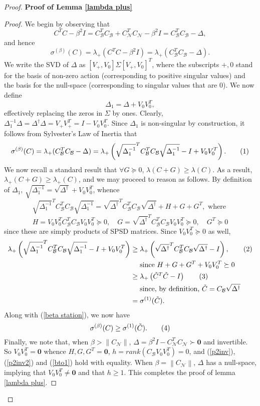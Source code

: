 \documentclass[11pt]{article}
\newcommand{\norm}[1]{\left\|#1\right\|}
\newcommand{\Geq}{\succeq}
\newcommand{\B}{\mathcal{B}}
\newcommand{\N}{\mathcal{N}}
\newcommand{\0}{\ensuremath{\mathbf{0}}}
\renewcommand{\>}{\succ}
\newcommand{\<}{\prec}
\newcommand\numberthis{\addtocounter{equation}{1}\tag{\theequation}}
\begin{document}
\begin{proof}
\noindent \textbf{Proof of Lemma \ref{lambda plus}}
\begin{proof}
We begin by observing that
\[ C^T C - \beta^2 I  = C_{\B} ^T C_{\B} + C_{\N} ^T C_{\N} - \beta^2 I = C_{\B} ^T C_{\B}  - \Delta, \]
and hence
\[ \sigma^{(\beta)} (C) = \lambda_+ \left( C^T C - \beta^2 I \right) = \lambda_+ \left( C_{\B} ^T C_{\B}  - \Delta \right). \]
We write the SVD of $\Delta$ as $[V_+, V_0] \Sigma [V_+, V_0]^T$, where the subscripts $+, 0$ stand for the basis of non-zero action (corresponding to positive singular values) and the basis for the null-space (corresponding to singular values that are 0). We now define 
\[ \Delta_1 = \Delta + V_0 V_0 ^T, \]
effectively replacing the zeros in $\Sigma$ by ones. Clearly, $\Delta_1 ^{-1} \Delta = \Delta^{\dagger} \Delta = V_+ V_+ ^T = I - V_0 V_0 ^T$. Since $\Delta_1$ is non-singular by construction, it follows from Sylvester's Law of Inertia that
\[ \sigma^{(\beta)} (C) = \lambda_+ (C_{\B} ^T C_{\B}  - \Delta) = \lambda_+ \left( \sqrt{\Delta_1 ^{-1}} ^T C_{\B} ^T C_{\B} \sqrt{\Delta_1 ^{-1}} -  I + V_0 V_0 ^T  \right) . \numberthis \label{beta station} \]
We now recall a standard result that $\forall G \Geq 0$, $\lambda(C + G) \geq \lambda(C)$. As a result, $\lambda_+ (C+G) \geq \lambda_+ (C)$, and we may proceed to reason as follows. By definition of $\Delta_1$, $\sqrt{\Delta_1^{-1}} = \sqrt{\Delta^{\dagger}} + V_0 V_0 ^T$, whence 
\[ \sqrt{ \Delta_1 ^{-1} } ^T C_{\B} ^T C_{\B} \sqrt{ \Delta_1 ^{-1}}  = \sqrt{\Delta^{\dagger}}^T C_{\B} ^T C_{\B} \sqrt{\Delta^{\dagger}} + H + G + G ^T, \text{ where } \]
\[ H = V_0 V_0 ^T C_{\B} ^T C_{\B} V_0 V_0 ^T \Geq 0, \quad  G = \sqrt{\Delta^{\dagger}}^T C_{\B} ^T C_{\B} V_0 V_0 ^T \Geq 0, \quad  G ^T \Geq 0 \] 
since these are simply products of SPSD matrices. Since $V_0 V_0 ^T \Geq 0$ as well, 
\begin{align*}
\lambda_+ \left( \sqrt{ \Delta_1 ^{-1} } ^T C_{\B} ^T C_{\B} \sqrt{ \Delta_1 ^{-1} } - I + V_0 V_0 ^T \right)  & \geq \lambda_+ \left( \sqrt{\Delta^{\dagger}}^T C_{\B} ^T C_{\B} \sqrt{\Delta^{\dagger}}  - I \right),  \numberthis \label{p2inv}\\ 
& \quad \text{ since } H + G + G ^T + V_0 V_0 ^T \Geq 0 \\
& \geq \lambda_+ \left( \tilde{C} ^T \tilde{C} - I \right) \numberthis \label{p2inv2} \\
& \quad \text{ since, by definition, } \tilde{C} = C_{\B} \sqrt{\Delta ^{\dagger}} \\
& = \sigma^{(1)}(\tilde C).
\end{align*}
Along with (\ref{beta station}), we now have
\[ \sigma^{(\beta)}(C) \geq \sigma^{(1)}(\tilde C). \numberthis \label{bto1} \]
Finally, we note that, when $\beta > \norm{C_{\N}}$, $\Delta = \beta ^2 I - C_{\N}^T C_{\N}  \> \mathbf{0}$ and invertible. So $V_0 V_0 ^T = \mathbf{0}$ whence $H, G, G^T = \mathbf{0}$, $h = rank(C_{\B} V_0 V_0 ^T) = 0$, and (\ref{p2inv}), (\ref{p2inv2}) and (\ref{bto1}) hold with equality. When $\beta = \norm{C_{\N}}$, $\Delta$ has a null-space, implying that $V_0 V_0 ^T \neq \mathbf{0}$ and that $h \geq 1$. This completes the proof of lemma \ref{lambda plus}.
\end{proof}


\end{proof}
\end{document}
